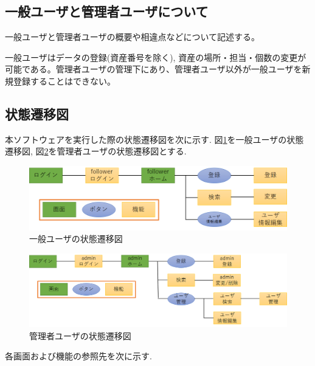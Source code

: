 \documentclass[11ptm]{jsarticle}
\begin{document}
\subsection{一般ユーザと管理者ユーザについて}
\label{sec:一般ユーザと管理者ユーザについて}
一般ユーザと管理者ユーザの概要や相違点などについて記述する。\par
一般ユーザはデータの登録(資産番号を除く), 資産の場所・担当・個数の変更が可能である。管理者ユーザの管理下にあり、管理者ユーザ以外が一般ユーザを新規登録することはできない。

\clearpage
\clearpage
\subsection{状態遷移図}
\label{sec:状態遷移図}
本ソフトウェアを実行した際の状態遷移図を次に示す. 図\ref{fig:一般ユーザの状態遷移図}を一般ユーザの状態遷移図, 図\ref{fig:管理者ユーザの状態遷移図}を管理者ユーザの状態遷移図とする.
\begin{figure}[h]
  \centering
  \includegraphics[keepaspectratio, width=0.8\linewidth]{source/follower_transition_diagram.png}
  \caption{\label{fig:一般ユーザの状態遷移図}一般ユーザの状態遷移図}
\end{figure}
\begin{figure}[h]
  \centering
  \includegraphics[keepaspectratio, width=0.8\linewidth]{source/admin_transition_diagram.png}
  \caption{\label{fig:管理者ユーザの状態遷移図}管理者ユーザの状態遷移図}
\end{figure}
各画面および機能の参照先を次に示す. \\
\end{document}

